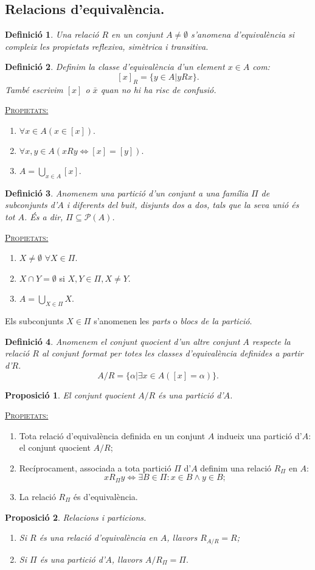 \documentclass[11pt]{article}
\newcommand{\propietats}{\underline{{\scshape Propietats:}}}
\newtheorem{defi}{Definició}[section]
\newtheorem{prop}{Proposició}[section]
\begin{document}
\subsection{Relacions d'equivalència.}
\begin{defi} Una relació $R$ en un conjunt $A\neq\emptyset$ s'anomena \textit{d'equivalència} si compleix les propietats reflexiva, simètrica i transitiva.\end{defi}
\begin{defi} Definim la \textit{classe d'equivalència} d'un element $x\in A$ com:
$$[x]_R=\{y\in A|yRx\}.$$
També escrivim $[x]$ o $\bar{x}$ quan no hi ha risc de confusió.\end{defi}
\propietats \begin{enumerate}
	\item $\forall x\in A(x\in [x]).$
	\item $\forall x,y\in A (xRy\iff [x]=[y]).$
	\item $A=\bigcup_{x\in A}[x].$
\end{enumerate}
\begin{defi} Anomenem una \textit{partició d'un conjunt} a una família $\Pi$ de subconjunts d'$A$ i diferents del buit, disjunts dos a dos, tals que la seva unió és tot $A$. És a dir, $\Pi\subseteq\mathcal{P}(A)$.\end{defi}
\propietats
\begin{enumerate}
	\item $X\neq\emptyset$ $\forall X\in\Pi.$
	\item $X\cap Y = \emptyset$ si $X,Y\in\Pi,X\neq Y.$
	\item $A=\bigcup_{X\in\Pi}X.$
\end{enumerate}
Els subconjunts $X\in\Pi$ s'anomenen les \textit{parts} o \textit{blocs de la partició}.\\
\begin{defi} Anomenem el \textit{conjunt quocient} d'un altre conjunt $A$ respecte la relació $R$ al conjunt format per totes les classes d'equivalència definides a partir d'$R$.$$A/R=\{\alpha|\exists x\in A([x]=\alpha)\}.$$\end{defi}
\begin{prop} El conjunt quocient $A/R$ és una partició d'$A$.\end{prop}
\noindent\propietats
\begin{enumerate}
	\item Tota relació d'equivalència definida en un conjunt $A$ indueix una partició d'$A$: el conjunt quocient $A/R$;
	\item Recíprocament, associada a tota partició $\Pi$ d'$A$ definim una relació $R_\Pi$ en $A$:
	$$xR_\Pi y\iff\exists B\in\Pi:x\in B\wedge y\in B;$$
	\item La relació $R_\Pi$ és d'equivalència.
\end{enumerate}
\begin{prop} Relacions i particions.
\begin{enumerate}
	\item Si $R$ és una relació d'equivalència en $A$, llavors $R_{A/R}=R$;
	\item Si $\Pi$ és una partició d'$A$, llavors $A/R_\Pi=\Pi.$
\end{enumerate}
\end{prop}
\end{document}
